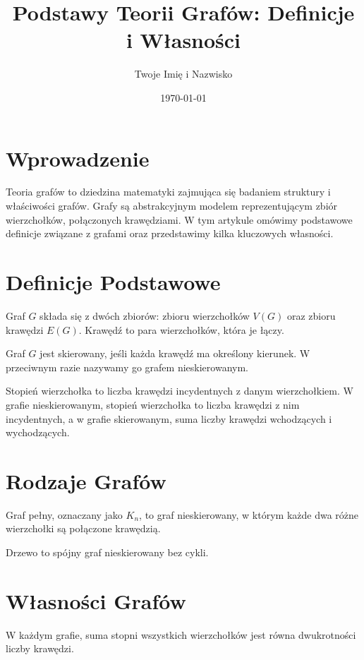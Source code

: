 \documentclass[12pt]{article}
\title{Podstawy Teorii Grafów: Definicje i Własności}
\author{Twoje Imię i Nazwisko}
\date{\today}
\begin{document}
\maketitle

\section{Wprowadzenie}
Teoria grafów to dziedzina matematyki zajmująca się badaniem struktury i właściwości grafów. Grafy są abstrakcyjnym modelem reprezentującym zbiór wierzchołków, połączonych krawędziami. W tym artykule omówimy podstawowe definicje związane z grafami oraz przedstawimy kilka kluczowych własności.

\section{Definicje Podstawowe}
\begin{definition}
Graf $G$ składa się z dwóch zbiorów: zbioru wierzchołków $V(G)$ oraz zbioru krawędzi $E(G)$. Krawędź to para wierzchołków, która je łączy.
\end{definition}

\begin{definition}
Graf $G$ jest skierowany, jeśli każda krawędź ma określony kierunek. W przeciwnym razie nazywamy go grafem nieskierowanym.
\end{definition}

\begin{definition}
Stopień wierzchołka to liczba krawędzi incydentnych z danym wierzchołkiem. W grafie nieskierowanym, stopień wierzchołka to liczba krawędzi z nim incydentnych, a w grafie skierowanym, suma liczby krawędzi wchodzących i wychodzących.
\end{definition}

\section{Rodzaje Grafów}
\begin{definition}
Graf pełny, oznaczany jako $K_n$, to graf nieskierowany, w którym każde dwa różne wierzchołki są połączone krawędzią.
\end{definition}

\begin{definition}
Drzewo to spójny graf nieskierowany bez cykli.
\end{definition}

\section{Własności Grafów}
\begin{theorem}
W każdym grafie, suma stopni wszystkich wierzchołków jest równa dwukrotności liczby krawędzi.
\end{theorem}
\end{document}
